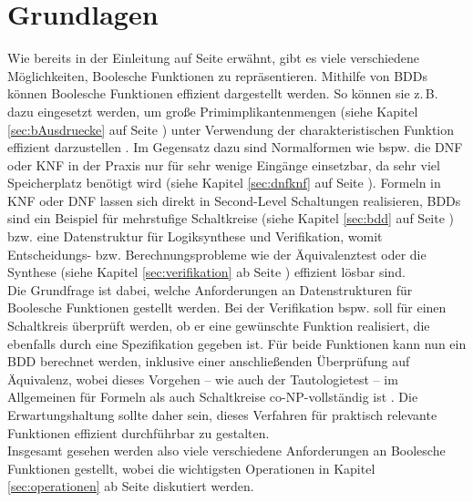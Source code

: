 \newpage
\section{Grundlagen}
\label{sec:bdd_grundlagen}
Wie bereits in der Einleitung auf Seite \pageref{sec:einleitung} erwähnt, gibt es viele verschiedene Möglichkeiten, Boolesche Funktionen zu repräsentieren. Mithilfe von BDDs können Boolesche Funktionen effizient dargestellt werden. So können sie z.\,B. dazu eingesetzt werden, um große Primimplikantenmengen (siehe Kapitel \ref{sec:bAusdruecke} auf Seite \pageref{sec:bAusdruecke}) unter Verwendung der charakteristischen Funktion effizient darzustellen \cite[S.106-108]{ms1999}. Im Gegensatz dazu sind Normalformen wie bspw. die DNF oder KNF in der Praxis nur für sehr wenige Eingänge einsetzbar, da sehr viel Speicherplatz benötigt wird (siehe Kapitel \ref{sec:dnfknf} auf Seite \pageref{sec:dnfknf}). Formeln in KNF oder DNF lassen sich direkt in Second-Level Schaltungen realisieren, BDDs sind ein Beispiel für mehrstufige Schaltkreise (siehe Kapitel \ref{sec:bdd} auf Seite \pageref{sec:bdd}) bzw. eine Datenstruktur für Logiksynthese und Verifikation, womit Entscheidungs- bzw. Berechnungsprobleme wie der Äquivalenztest oder die Synthese (siehe Kapitel \ref{sec:verifikation} ab Seite \pageref{sec:verifikation}) effizient lösbar sind.\\
Die Grundfrage ist dabei, welche Anforderungen an Datenstrukturen für Boolesche Funktionen gestellt werden. Bei der Verifikation bspw. soll für einen Schaltkreis überprüft werden, ob er eine gewünschte Funktion realisiert, die ebenfalls durch eine Spezifikation gegeben ist. Für beide Funktionen kann nun ein BDD berechnet werden, inklusive einer anschließenden Überprüfung auf Äquivalenz, wobei dieses Vorgehen -- wie auch der Tautologietest -- im Allgemeinen für Formeln als auch Schaltkreise co-NP-vollständig ist \cite[S.6]{s2007}. Die Erwartungshaltung sollte daher sein, dieses Verfahren für praktisch relevante Funktionen effizient durchführbar zu gestalten.\\
Insgesamt gesehen werden also viele verschiedene Anforderungen an Boolesche Funktionen gestellt, wobei die wichtigsten Operationen in Kapitel \ref{sec:operationen} ab Seite \pageref{sec:operationen} diskutiert werden.

